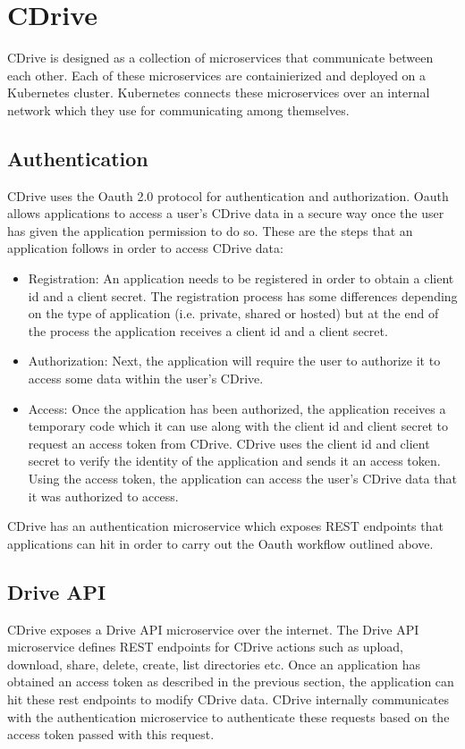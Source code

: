 \section{CDrive}
CDrive is designed as a collection of microservices that communicate between each other. Each of 
these microservices are containierized and deployed on a Kubernetes cluster. Kubernetes connects 
these microservices over an internal network which they use for communicating among themselves.


\subsection{Authentication}
CDrive uses the Oauth 2.0 protocol for authentication and authorization. Oauth allows applications 
to access a user's CDrive data in a secure way once the user has given the application permission 
to do so. These are the steps that an application follows in order to access CDrive data:

\begin{itemize}
  \item Registration: An application needs to be registered in order to obtain a client id and a
    client secret. The registration process has some differences depending on the type of
    application (i.e. private, shared or hosted) but at the end of the process the application 
    receives a client id and a client secret.
  \item Authorization: Next, the application will require the user to authorize it to access some
    data within the user's CDrive.
  \item Access: Once the application has been authorized, the application receives a temporary code
    which it can use along with the client id and client secret to request an access token from 
    CDrive. CDrive uses the client id and client secret to verify the identity of the application 
    and sends it an access token. Using the access token, the application
    can access the user's CDrive data that it was authorized to access.
\end{itemize}

CDrive has an authentication microservice which exposes REST endpoints that applications 
can hit in order to carry out the Oauth workflow outlined above.

\subsection{Drive API}
CDrive exposes a Drive API microservice over the internet. The Drive API microservice defines REST
endpoints for CDrive actions such as upload, download, share, delete, create, list directories etc.
Once an application has obtained an access token as described in the previous section, the
application can hit these rest endpoints to modify CDrive data. CDrive internally communicates with
the authentication microservice to authenticate these requests based on the access token passed with
this request.

